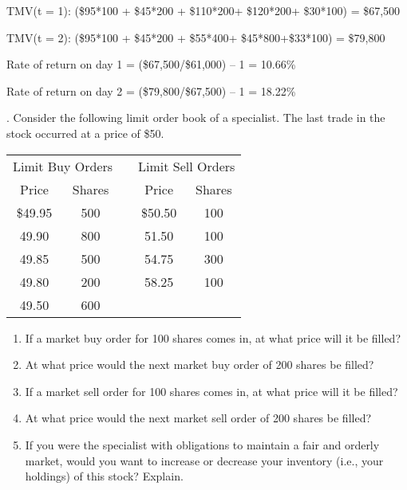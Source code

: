\documentclass[11.5pt]{article}
\begin{document}
TMV(t = 1): (\$95*100 + \$45*200 + \$110*200+ \$120*200+ \$30*100) = \$67,500 

TMV(t = 2): (\$95*100 + \$45*200 + \$55*400+ \$45*800+\$33*100) = \$79,800 

Rate of return on day 1 = (\$67,500/\$61,000) – 1 = 10.66\% 

Rate of return on day 2 = (\$79,800/\$67,500) – 1 = 18.22\%




\vspace{40pt}



. Consider the following limit order book of a specialist. The last trade in the stock occurred at a price of \$50.

\begin{table}[h]
	\begin{tabular}{ccccc}
		\hline
		\multicolumn{2}{c}{Limit Buy Orders} &  & \multicolumn{2}{c}{Limit Sell Orders} \\ \cline{1-2} \cline{4-5} 
		Price             & Shares           &  & Price              & Shares           \\ \cline{1-2} \cline{4-5} 
		\$49.95           & 500              &  & \$50.50            & 100              \\
		49.90             & 800              &  & 51.50              & 100              \\
		49.85             & 500              &  & 54.75              & 300              \\
		49.80             & 200              &  & 58.25              & 100              \\
		49.50             & 600              &  &                    &                  \\ \hline
	\end{tabular}
\end{table}


\begin{enumerate}[a]
	\item If a market buy order for 100 shares comes in, at what price will it be filled?
	
	\item At what price would the next market buy order of 200 shares be filled?
	
	\item If a market sell order for 100 shares comes in, at what price will it be filled?
	
	\item At what price would the next market sell order of 200 shares be filled?
	
	\item If you were the specialist with obligations to maintain a fair and orderly market, would you want to increase or decrease your inventory (i.e., your holdings) of this stock? Explain.
	
\end{enumerate}
\end{document}
